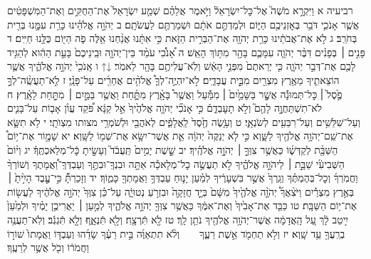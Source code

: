 \documentclass[twoside, openany, parskip=half, 11pt]{book}
\begin{document}
רביעיה א וַיִּקְרָ֣א מֹשֶׁה֮ אֶל־כׇּל־יִשְׂרָאֵל֒ וַיֹּ֣אמֶר אֲלֵהֶ֗ם שְׁמַ֤ע יִשְׂרָאֵל֙ אֶת־הַחֻקִּ֣ים וְאֶת־הַמִּשְׁפָּטִ֔ים אֲשֶׁ֧ר אָנֹכִ֛י דֹּבֵ֥ר בְּאׇזְנֵיכֶ֖ם הַיּ֑וֹם וּלְמַדְתֶּ֣ם אֹתָ֔ם וּשְׁמַרְתֶּ֖ם לַעֲשֹׂתָֽם׃ ב יְהֹוָ֣ה אֱלֹהֵ֗ינוּ כָּרַ֥ת עִמָּ֛נוּ בְּרִ֖ית בְּחֹרֵֽב׃ ג לֹ֣א אֶת־אֲבֹתֵ֔ינוּ כָּרַ֥ת יְהֹוָ֖ה אֶת־הַבְּרִ֣ית הַזֹּ֑את כִּ֣י אִתָּ֔נוּ אֲנַ֨חְנוּ אֵ֥לֶּה פֹ֛ה הַיּ֖וֹם כֻּלָּ֥נוּ חַיִּֽים׃ ד פָּנִ֣ים ׀ בְּפָנִ֗ים דִּבֶּ֨ר יְהֹוָ֧ה עִמָּכֶ֛ם בָּהָ֖ר מִתּ֥וֹךְ הָאֵֽשׁ׃ ה אָ֠נֹכִ֠י עֹמֵ֨ד בֵּין־יְהֹוָ֤ה וּבֵֽינֵיכֶם֙ בָּעֵ֣ת הַהִ֔וא לְהַגִּ֥יד לָכֶ֖ם אֶת־דְּבַ֣ר יְהֹוָ֑ה כִּ֤י יְרֵאתֶם֙ מִפְּנֵ֣י הָאֵ֔שׁ וְלֹֽא־עֲלִיתֶ֥ם בָּהָ֖ר לֵאמֹֽר׃
↓↑ ו אָֽנֹכִ֖י֙ יְהֹוָ֣ה אֱלֹהֶ֑֔יךָ אֲשֶׁ֧ר הוֹצֵאתִ֛יךָ מֵאֶ֥רֶץ מִצְרַ֖יִם מִבֵּ֣֥ית עֲבָדִ֑‍ֽים׃ לֹ֣א־יִהְיֶ֥‍ֽה־לְךָ֛֩ אֱלֹהִ֥֨ים אֲחֵרִ֖֜ים עַל־פָּנָֽ֗יַ׃ ז לֹֽ֣א־תַעֲשֶֽׂ֨ה־לְךָ֥֣ פֶ֣֙סֶל֙ ׀ כׇּל־תְּמוּנָ֔֡ה אֲשֶׁ֤֣ר בַּשָּׁמַ֣֙יִם֙ ׀ מִמַּ֔֡עַל וַאֲשֶׁ֥ר֩ בָּאָ֖֨רֶץ מִתַָּ֑֜חַת וַאֲשֶׁ֥ר בַּמַּ֖֣יִם ׀ מִתַּ֥֣חַת לָאָֽ֗רֶץ׃ ח לֹא־תִשְׁתַּחֲוֶ֥֣ה לָהֶ֖ם֮ וְלֹ֣א תָעׇבְדֵ֑ם֒ כִּ֣י אָנֹכִ֞י יְהֹוָ֤ה אֱלֹהֶ֙יךָ֙ אֵ֣ל קַנָּ֔א פֹּ֠קֵד עֲוֺ֨ן אָב֧וֹת עַל־בָּנִ֛ים וְעַל־שִׁלֵּשִׁ֥ים וְעַל־רִבֵּעִ֖ים לְשֹׂנְאָֽ֑י׃ ט וְעֹ֥‍֤שֶׂה חֶ֖֙סֶד֙ לַֽאֲלָפִ֑֔ים לְאֹהֲבַ֖י וּלְשֹׁמְרֵ֥י מצותו מִצְוֺתָֽי׃
י לֹ֥א תִשָּׂ֛א אֶת־שֵֽׁם־יְהֹוָ֥ה אֱלֹהֶ֖יךָ לַשָּׁ֑וְא כִּ֣י לֹ֤א יְנַקֶּה֙ יְהֹוָ֔ה אֵ֛ת אֲשֶׁר־יִשָּׂ֥א אֶת־שְׁמ֖וֹ לַשָּֽׁוְא׃
יא שָׁמ֛֣וֹר אֶת־י֥וֹם֩ הַשַּׁבָּ֖֨ת לְקַדְּשׁ֑֜וֹ כַּאֲשֶׁ֥ר צִוְּךָ֖֣ ׀ יְהֹוָ֥֣ה אֱלֹהֶֽ֗יךָ׃ יב שֵׁ֤֣שֶׁת יָמִ֣ים֙ תַּֽעֲבֹ֔ד֮ וְעָשִׂ֖֣יתָ כׇּֿל־מְלַאכְתֶּֽךָ֒׃ יג וְי֨וֹם֙ הַשְּׁבִיעִ֔‍֜י שַׁבָּ֖֣ת ׀ לַיהֹוָ֣ה אֱלֹהֶ֑֗יךָ לֹ֣א תַעֲשֶׂ֣ה כׇל־מְלָאכָ֡ה אַתָּ֣ה וּבִנְךָֽ־וּבִתֶּ֣ךָ וְעַבְדְּךָֽ־וַ֠אֲמָתֶךָ וְשׁוֹרְךָ֨ וַחֲמֹֽרְךָ֜ וְכׇל־בְּהֶמְתֶּ֗ךָ וְגֵֽרְךָ֙ אֲשֶׁ֣ר בִּשְׁעָרֶ֔יךָ לְמַ֗עַן יָנ֛וּחַ עַבְדְּךָ֥ וַאֲמָתְךָ֖ כָּמֽ֑וֹךָ׃ יד וְזָכַרְתָּ֗֞ כִּ֣י־עֶ֤֥בֶד הָיִ֣֙יתָ֙ ׀ בְּאֶ֣רֶץ מִצְרַ֔֗יִם וַיֹּצִ֨אֲךָ֜֩ יְהֹוָ֤֨ה אֱלֹהֶ֤֙יךָ֙ מִשָּׁ֔ם֙ בְּיָ֥‍֤ד חֲזָקָ֖ה֙ וּבִזְרֹ֣עַ נְטוּיָ֑֔ה עַל־כֵּ֗ן צִוְּךָ֙ יְהֹוָ֣ה אֱלֹהֶ֔יךָ לַעֲשׂ֖וֹת אֶת־י֥וֹם הַשַּׁבָּֽת׃
טו כַּבֵּ֤ד אֶת־אָבִ֙יךָ֙ וְאֶת־אִמֶּ֔ךָ כַּאֲשֶׁ֥ר צִוְּךָ֖ יְהֹוָ֣ה אֱלֹהֶ֑יךָ לְמַ֣עַן ׀ יַאֲרִיכֻ֣ן יָמֶ֗יךָ וּלְמַ֙עַן֙ יִ֣יטַב לָ֔ךְ עַ֚ל הָֽאֲדָמָ֔ה אֲשֶׁר־יְהֹוָ֥ה אֱלֹהֶ֖יךָ נֹתֵ֥ן לָֽךְ׃
טז לֹ֥֖א תִּֿרְצָ֖‍ֽח׃
וְלֹ֣‍֖א תִּֿנְאָ֑‍ֽף׃
וְלֹ֣֖א תִּֿגְנֹֽ֔ב׃
וְלֹֽא־תַעֲנֶ֥ה בְרֵֽעֲךָ֖ עֵ֥ד שָֽׁוְא׃
יז וְלֹ֥א תַחְמֹ֖ד אֵ֣שֶׁת רֵעֶ֑ךָ  וְלֹ֨א תִתְאַוֶּ֜ה בֵּ֣ית רֵעֶ֗ךָ שָׂדֵ֜הוּ וְעַבְדּ֤וֹ וַאֲמָתוֹ֙ שׁוֹר֣וֹ וַחֲמֹר֔וֹ וְכֹ֖ל אֲשֶׁ֥ר לְרֵעֶֽךָ׃
\end{document}

